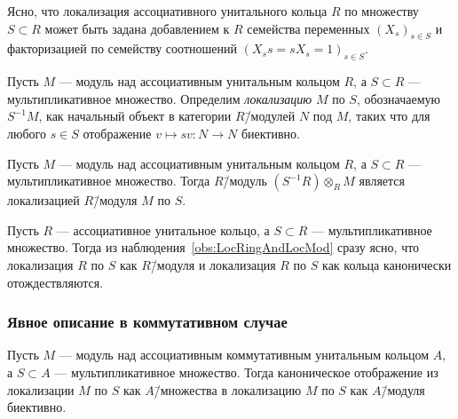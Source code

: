 \documentclass[
	extrafontsizes,
	11pt,
	hyphens,
]{memoir}
\begin{document}
\begin{observation}
Ясно, что локализация ассоциативного унитального кольца \(R\) по множеству \(S \subset R\) может быть задана
добавлением к \(R\) семейства переменных \((X_s)_{s \in S}\) и факторизацией по семейству соотношений
\((X_s s = s X_s = 1)_{s \in S}\).
\end{observation}

\begin{definition}
Пусть \(M\) --- модуль над ассоциативным унитальным кольцом \(R\), а \(S \subset R\) --- мультипликативное множество.
Определим \emph{локализацию} \(M\) по \(S\), обозначаемую \(S^{-1}M\), как начальный объект в категории \(R\)\=/модулей \(N\) под \(M\), таких что для любого \(s \in S\) отображение \(v \mapsto sv : N \to N\) биективно.
\end{definition}

\begin{observation}
Пусть \(M\) --- модуль над ассоциативным унитальным кольцом \(R\), а \(S \subset R\) --- мультипликативное множество.
\label{obs:LocRingAndLocMod}
Тогда \(R\)\=/модуль \((S^{-1}R) \otimes_R M\)
является локализацией \(R\)\=/модуля \(M\) по \(S\).
\end{observation}

\begin{observation}
Пусть \(R\) --- ассоциативное унитальное кольцо, а \(S \subset R\) --- мультипликативное множество.
Тогда из наблюдения~\ref{obs:LocRingAndLocMod} сразу ясно, что локализация \(R\) по \(S\) как \(R\)\=/модуля и локализация \(R\) по \(S\) как кольца канонически отождествляются.
\end{observation}

\subsubsection{Явное описание в коммутативном случае}

\begin{theorem}
Пусть \(M\) --- модуль над ассоциативным коммутативным унитальным кольцом \(A\), а \(S \subset A\) --- мультипликативное множество.%
\label{thm:ModuleLoc}
Тогда каноническое отображение из локализации \(M\) по \(S\) как \(A\)\=/множества в локализацию \(M\) по \(S\) как \(A\)\=/модуля биективно.
\end{theorem}
\end{document}
